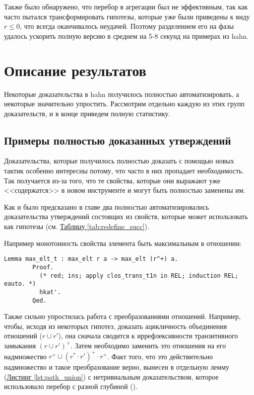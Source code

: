 \documentclass[times
              ]{itmo-student-thesis}
\begin{document}
      Также было обнаружено, что перебор в агрегации был не эффективным, так как часто пытался
      трансформировать гипотезы, которые уже были приведены к виду $r \le 0$, что всегда оканчивалось
      неудачей. Поэтому разделением его на фазы удалось ускорить полную версию  в среднем на
      5-8 секунд на примерах из hahn.


  \section{Описание результатов}

    Некоторые доказательства в hahn получилось полностью автоматизировать, а некоторые значительно
    упростить. Рассмотрим отдельно каждую из этих групп доказательств, и в конце приведем полную
    статистику.

    \subsection{Примеры полностью доказанных утверждений}

      Доказательства, которые получилось полностью доказать с помощью новых тактик особенно интересны
      потому, что часто в них пропадает необходимость. Так получается из-за того, что те свойства,
      которые они выражают уже <<содержатся>> в новом инструменте и могут быть полностью заменены им.

      Как и было предсказано в главе два полностью автоматизировались доказательства утверждений
      состоящих из свойств, которые  может использовать как гипотезы
      (см. \hyperref[tab:redefine_succ]{Таблицу \ref{tab:redefine_succ}}).

      Например монотонность свойства элемента быть максимальным в отношении:
      \begin{lstlisting}[float=false, gobble=8]
        Lemma max_elt_t : max_elt r a -> max_elt (r^+) a.
        Proof.
          (* red; ins; apply clos_trans_t1n in REL; induction REL; eauto. *)
          hkat'.
        Qed.
      \end{lstlisting}

      Также сильно упростилась работа с преобразованиями отношений.
      Например, чтобы, исходя из некоторых гипотез, доказать ацикличность объединения
      отношений ($r \cup r'$), она сначала сводится к иррефлексивности транзитивного замыкания
      $(r \cup r')^+$.
      Затем необходимо заменить это отношения на его надмножество $r^+ \cup (r^* \cdot r')^+ \cdot r^+$.
      Факт того, что это действительно надмножество и такое преобразование
      верно, вынесен в отдельную лемму  (\hyperref[lst:path_union]{Листинг \ref{lst:path_union}})
      с нетривиальным доказательством, которое использовало перебор с разной глубиной
      ().
\end{document}
